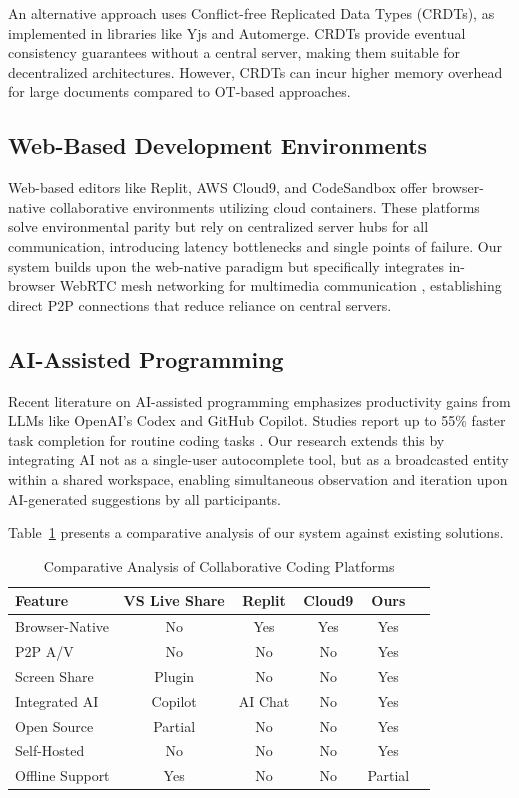 \documentclass[conference]{IEEEtran}
\begin{document}
An alternative approach uses Conflict-free Replicated Data Types (CRDTs), as implemented in libraries like Yjs \cite{b8} and Automerge. CRDTs provide eventual consistency guarantees without a central server, making them suitable for decentralized architectures. However, CRDTs can incur higher memory overhead for large documents compared to OT-based approaches.

\subsection{Web-Based Development Environments}
Web-based editors like Replit, AWS Cloud9, and CodeSandbox offer browser-native collaborative environments utilizing cloud containers. These platforms solve environmental parity but rely on centralized server hubs for all communication, introducing latency bottlenecks and single points of failure. Our system builds upon the web-native paradigm but specifically integrates in-browser WebRTC mesh networking for multimedia communication \cite{b3}, establishing direct P2P connections that reduce reliance on central servers.

\subsection{AI-Assisted Programming}
Recent literature on AI-assisted programming \cite{b11} emphasizes productivity gains from LLMs like OpenAI's Codex and GitHub Copilot. Studies report up to 55\% faster task completion for routine coding tasks \cite{b15}. Our research extends this by integrating AI not as a single-user autocomplete tool, but as a broadcasted entity within a shared workspace, enabling simultaneous observation and iteration upon AI-generated suggestions by all participants.

Table~\ref{tab:comparison} presents a comparative analysis of our system against existing solutions.

\begin{table}[H]
\centering
\caption{Comparative Analysis of Collaborative Coding Platforms}
\label{tab:comparison}
\renewcommand{\arraystretch}{1.2}
\begin{tabular}{|p{1.6cm}|c|c|c|c|c|}
\hline
\textbf{Feature} & \textbf{VS Live Share} & \textbf{Replit} & \textbf{Cloud9} & \textbf{Ours} \\
\hline
Browser-Native & No & Yes & Yes & Yes \\
\hline
P2P A/V & No & No & No & Yes \\
\hline
Screen Share & Plugin & No & No & Yes \\
\hline
Integrated AI & Copilot & AI Chat & No & Yes \\
\hline
Open Source & Partial & No & No & Yes \\
\hline
Self-Hosted & No & No & No & Yes \\
\hline
Offline Support & Yes & No & No & Partial \\
\hline
\end{tabular}
\end{table}
\end{document}
